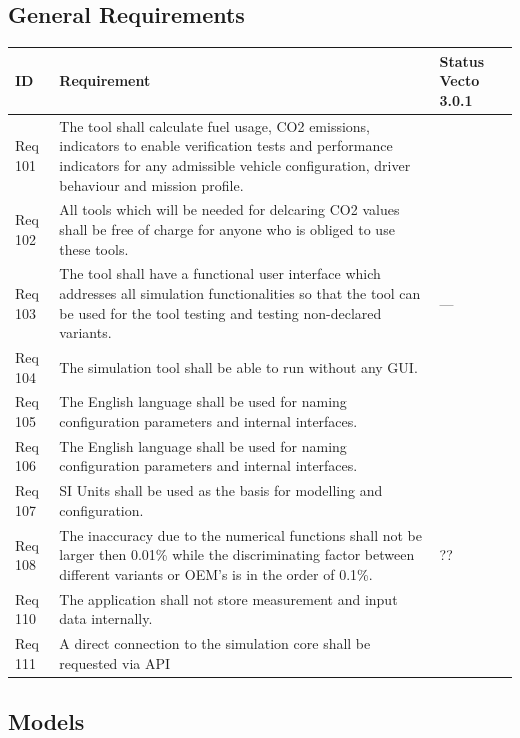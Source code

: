 \subsection{General Requirements} %
\label{sub:general_requirements}


\begin{tabular}{L{\IdColWidth}|L{\ReqColWidth}|M{\StatusColWidth}}
ID & Requirement & Status Vecto 3.0.1 \\ \hline\hline
Req 101	& The tool shall calculate fuel usage, CO2 emissions, indicators to enable verification tests and performance indicators for any admissible vehicle configuration, driver behaviour and mission profile.  & 
	\Vcheck	\\ \hline
Req 102 & All tools which will be needed for delcaring CO2 values shall be free of charge for anyone who is obliged to use these tools. & 
	\Vcheck	\\ \hline
Req 103 & The tool shall have a functional user interface which addresses all simulation functionalities so that the tool can be used for the tool testing and testing non-declared variants. & 
	---	\\ \hline
Req 104 & The simulation tool shall be able to run without any GUI. & 
	\Vcheck	\\ \hline
Req 105 & The English language shall be used for naming configuration parameters and internal interfaces. & 
	\Vcheck	\\ \hline
Req 106 & The English language shall be used for naming configuration parameters and internal interfaces. & 
	\Vcheck	\\ \hline
Req 107 & SI Units shall be used as the basis for modelling and configuration. & 
	\Vcheck	\\ \hline
Req 108 & The inaccuracy due to the numerical functions shall not be larger then 0.01\% while the discriminating factor between different variants or OEM's is in the order of 0.1\%. & 
	??	\\ \hline
Req 110 & The application shall not store measurement and input data internally. & 
	\Vcheck	\\ \hline
Req 111 & A direct connection to the simulation core shall be requested via API & 
	\Vtodo	\\ \hline
\end{tabular}

\subsection{Models} %
\label{sub:models}

